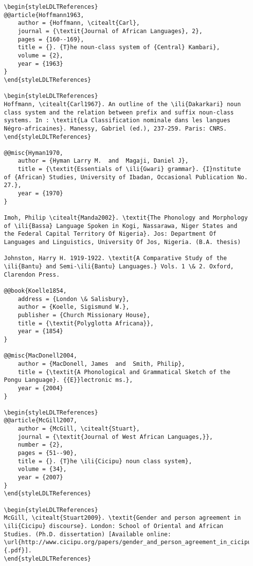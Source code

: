 \documentclass[output=paper]{langsci/langscibook}
\begin{document}
\begin{verbatim}
\begin{styleLDLTReferences}
@@article{Hoffmann1963,
	author = {Hoffmann, \citealt{Carl},
	journal = {\textit{Journal of African Languages}, 2},
	pages = {160--169},
	title = {}. {T}he noun-class system of {Central} Kambari},
	volume = {2},
	year = {1963}
}
\end{styleLDLTReferences}

\begin{styleLDLTReferences}
Hoffmann, \citealt{Carl1967}. An outline of the \ili{Dakarkari} noun class system and the relation between prefix and suffix noun-class systems. In : \textit{La Classification nominale dans les langues Négro-africaines}. Manessy, Gabriel (ed.), 237-259. Paris: CNRS.
\end{styleLDLTReferences}

@@misc{Hyman1970,
	author = {Hyman Larry M.  and  Magaji, Daniel J},
	title = {\textit{Essentials of \ili{Gwari} grammar}. {I}nstitute of {African} Studies, University of Ibadan, Occasional Publication No. 27.},
	year = {1970}
}

Imoh, Philip \citealt{Manda2002}. \textit{The Phonology and Morphology of \ili{Bassa} Language Spoken in Kogi, Nassarawa, Niger States and the Federal Capital Territory Of Nigeria}. Jos: Department Of Languages and Linguistics, University Of Jos, Nigeria. (B.A. thesis)

Johnston, Harry H. 1919-1922. \textit{A Comparative Study of the \ili{Bantu} and Semi-\ili{Bantu} Languages.} Vols. 1 \& 2. Oxford, Clarendon Press.

@@book{Koelle1854,
	address = {London \& Salisbury},
	author = {Koelle, Sigismund W.},
	publisher = {Church Missionary House},
	title = {\textit{Polyglotta Africana}},
	year = {1854}
}

@@misc{MacDonell2004,
	author = {MacDonell, James  and  Smith, Philip},
	title = {\textit{A Phonological and Grammatical Sketch of the Pongu Language}. {{E}}lectronic ms.},
	year = {2004}
}

\begin{styleLDLTReferences}
@@article{McGill2007,
	author = {McGill, \citealt{Stuart},
	journal = {\textit{Journal of West African Languages,}},
	number = {2},
	pages = {51--90},
	title = {}. {T}he \ili{Cicipu} noun class system},
	volume = {34},
	year = {2007}
}
\end{styleLDLTReferences}

\begin{styleLDLTReferences}
McGill, \citealt{Stuart2009}. \textit{Gender and person agreement in \ili{Cicipu} discourse}. London: School of Oriental and African Studies. (Ph.D. dissertation) [Available online: \url{http://www.cicipu.org/papers/gender_and_person_agreement_in_cicipu_discourse}\href{http://www.cicipu.org/papers/gender_and_person_agreement_in_cicipu_discourse.pdf}{.pdf}].
\end{styleLDLTReferences}


\end{verbatim}
\end{document}
